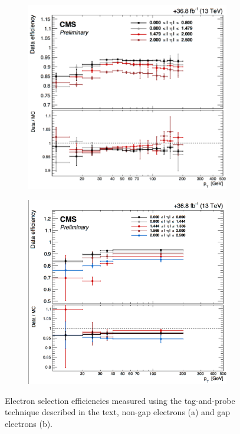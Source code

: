 
\begin{figure}[tbh]
\centering
\begin{subfigure}{0.95\textwidth}
\centering
\includegraphics[width=3.5in]{Figures/Electrons/ele_eff_pt.pdf}
\caption{}
\end{subfigure}
\begin{subfigure}{0.95\textwidth}
\centering
\includegraphics[width=3.5in]{Figures/Electrons/gap_ele_eff_pt.pdf}
\caption{}
\end{subfigure}
\caption{Electron selection efficiencies measured using the tag-and-probe technique described in the text, non-gap electrons (a) and gap electrons (b).}
\label{fig:ele_sel_pt_turn_on}
\end{figure}

